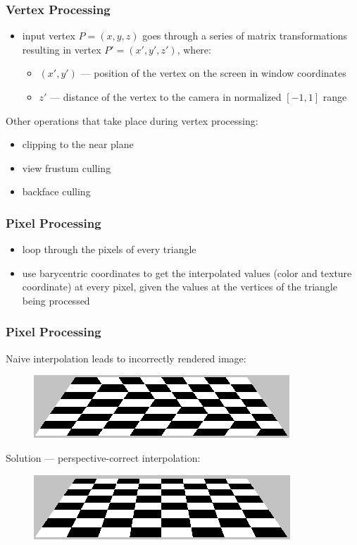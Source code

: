 \documentclass[ignorenonframetext,handout,english]{beamer}
\begin{document}
\frame
{
	\frametitle{Vertex Processing}
	{
		\pause

		\begin{itemize}
			\item input vertex $P = (x, y, z)$ goes through a series of matrix transformations resulting in vertex $P' = (x', y', z')$, where:
				\begin{itemize}
					\item $(x', y')$ --- position of the vertex on the screen in window coordinates
					\item $z'$ --- distance of the vertex to the camera in normalized $[-1, 1]$ range
				\end{itemize}
		\end{itemize}

		\pause

		Other operations that take place during vertex processing:

		\begin{itemize}
			\item clipping to the near plane
			\item view frustum culling
			\item backface culling
		\end{itemize}
	}
}

\frame
{
	\frametitle{Pixel Processing}
	{
		\pause

		\begin{itemize}
			\item loop through the pixels of every triangle
			\item use barycentric coordinates to get the interpolated values (color and texture coordinate) at every pixel, given the values at the vertices of the triangle being processed
		\end{itemize}
	}
}

\frame
{
	\frametitle{Pixel Processing}
	{
		Naive interpolation leads to incorrectly rendered image:

		\begin{figure}
		\centering
		\includegraphics[scale=0.6]{interpolation_a.png}
		\end{figure}

		\pause

		Solution --- perspective-correct interpolation:

		\begin{figure}
		\centering
		\includegraphics[scale=0.6]{interpolation_b.png}
		\end{figure}
	}
}
\end{document}
